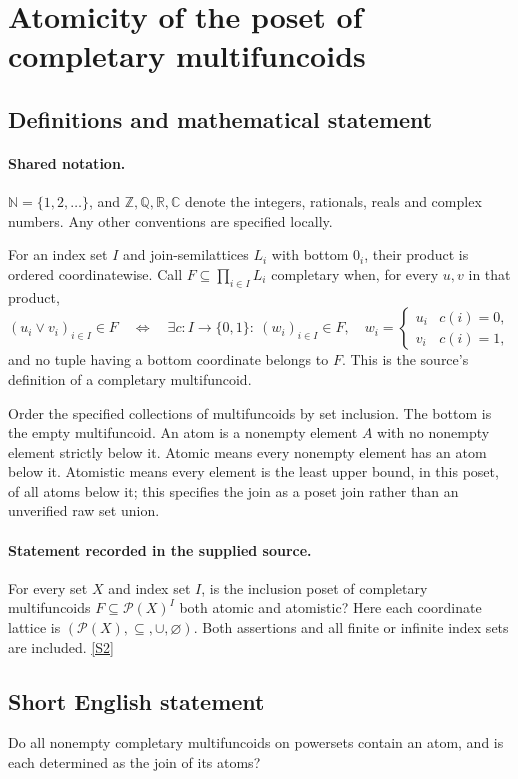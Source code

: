 \documentclass[11pt]{article}
\newcommand{\sref}[2]{\hyperlink{source:#1:#2}{[S#2]}}
\begin{document}
\section{Atomicity of the poset of completary multifuncoids}\label{statement}

\subsection{Definitions and mathematical statement}

\paragraph{Shared notation.}$\mathbb N=\{1,2,\ldots\}$, and $\mathbb Z,\mathbb Q,\mathbb R,\mathbb C$ denote the integers, rationals, reals and complex numbers. Any other conventions are specified locally.


For an index set $I$ and join-semilattices $L_i$ with bottom $0_i$, their product is ordered coordinatewise. Call $F\subseteq\prod_{i\in I}L_i$ completary when, for every $u,v$ in that product,
\[
 (u_i\vee v_i)_{i\in I}\in F
 \quad\Longleftrightarrow\quad
 \exists c:I\to\{0,1\}:\ (w_i)_{i\in I}\in F,
 \quad w_i=\begin{cases}u_i&c(i)=0,\\v_i&c(i)=1,\end{cases}
\]
and no tuple having a bottom coordinate belongs to $F$. This is the source's definition of a completary multifuncoid.

Order the specified collections of multifuncoids by set inclusion. The bottom is the empty multifuncoid. An atom is a nonempty element $A$ with no nonempty element strictly below it. Atomic means every nonempty element has an atom below it. Atomistic means every element is the least upper bound, in this poset, of all atoms below it; this specifies the join as a poset join rather than an unverified raw set union.
\paragraph{Statement recorded in the supplied source.}
For every set $X$ and index set $I$, is the inclusion poset of completary multifuncoids $F\subseteq\mathcal P(X)^I$ both atomic and atomistic? Here each coordinate lattice is $(\mathcal P(X),\subseteq,\cup,\varnothing)$. Both assertions and all finite or infinite index sets are included. \sref{statement}{2}
\subsection{Short English statement}
Do all nonempty completary multifuncoids on powersets contain an atom, and is each determined as the join of its atoms?
\end{document}
